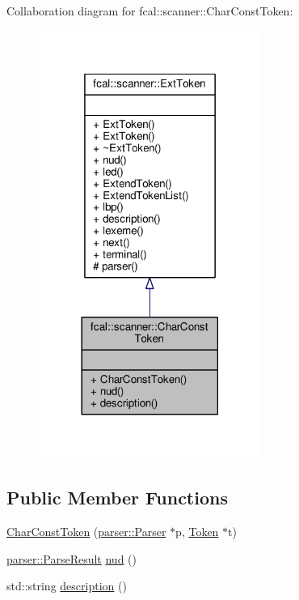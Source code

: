 Collaboration diagram for fcal\+:\+:scanner\+:\+:Char\+Const\+Token\+:
\nopagebreak
\begin{figure}[H]
\begin{center}
\leavevmode
\includegraphics[width=206pt]{classfcal_1_1scanner_1_1CharConstToken__coll__graph}
\end{center}
\end{figure}
\subsection*{Public Member Functions}
\begin{DoxyCompactItemize}
\item 
\hyperlink{classfcal_1_1scanner_1_1CharConstToken_ae108041381482344ee7cf3bf0629fbba}{Char\+Const\+Token} (\hyperlink{classfcal_1_1parser_1_1Parser}{parser\+::\+Parser} $\ast$p, \hyperlink{classfcal_1_1scanner_1_1Token}{Token} $\ast$t)
\item 
\hyperlink{classfcal_1_1parser_1_1ParseResult}{parser\+::\+Parse\+Result} \hyperlink{classfcal_1_1scanner_1_1CharConstToken_a5e9299e684f969cde0f71c0041e92153}{nud} ()
\item 
std\+::string \hyperlink{classfcal_1_1scanner_1_1CharConstToken_a283d5fb12d36caac1afed73c1035b562}{description} ()
\end{DoxyCompactItemize}
